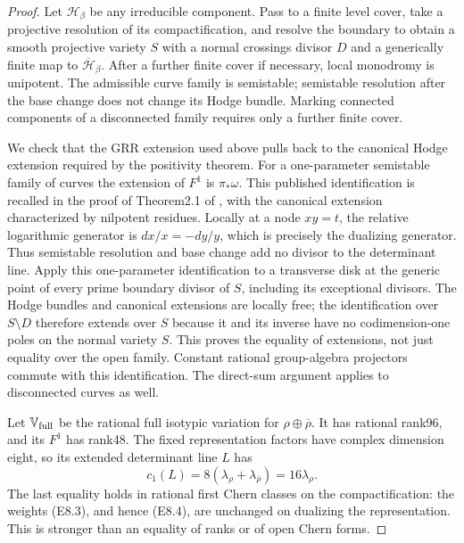 \begin{proof}
Let $\mathcal H_\beta$ be any irreducible component.  Pass to a
finite level cover, take a projective resolution of its
compactification, and resolve the boundary to obtain a smooth
projective variety $S$ with a normal crossings divisor $D$ and
a generically finite map to $\overline{\mathcal H}_\beta$.
After a further finite cover if necessary, local monodromy is
unipotent.  The admissible curve family is semistable; semistable
resolution after the base change does not change its Hodge
bundle.  Marking connected components of a disconnected family
requires only a further finite cover.

We check that the GRR extension used above pulls back to the
canonical Hodge extension required by the positivity theorem.
For a one-parameter semistable family of curves the extension of
$F^1$ is $\pi_*\omega$.  This published identification is recalled
in the proof of Theorem2.1 of \cite[p.~242]{E8GRR:CD}, with the
canonical extension characterized by nilpotent residues.  Locally
at a node $xy=t$, the relative logarithmic generator is
$dx/x=-dy/y$, which is precisely the dualizing generator.  Thus
semistable resolution and base change add no divisor to the
determinant line.  Apply this one-parameter identification to a
transverse disk at the generic point of every prime boundary
divisor of $S$, including its exceptional divisors.  The Hodge
bundles and canonical extensions are locally free; the
identification over $S\setminus D$ therefore extends over $S$
because it and its inverse have no codimension-one poles on the
normal variety $S$.  This proves the equality of extensions,
not just equality over the open family.  Constant rational
group-algebra projectors commute with this identification.
The direct-sum argument applies to disconnected curves as well.

Let $\mathbb V_{\rm full}$ be the rational full isotypic
variation for $\rho\oplus\overline\rho$.  It has rational rank96,
and its $F^1$ has rank48.  The fixed representation factors have
complex dimension eight, so its extended determinant line $L$
has
\[
 c_1(L)=8(\lambda_\rho+\lambda_{\overline\rho})
                         =16\lambda_\rho.                    \tag{E8.21}
\]
The last equality holds in rational first Chern classes on the
compactification: the weights (E8.3), and hence (E8.4), are
unchanged on dualizing the representation.  This is stronger
than an equality of ranks or of open Chern forms.


\end{proof}
